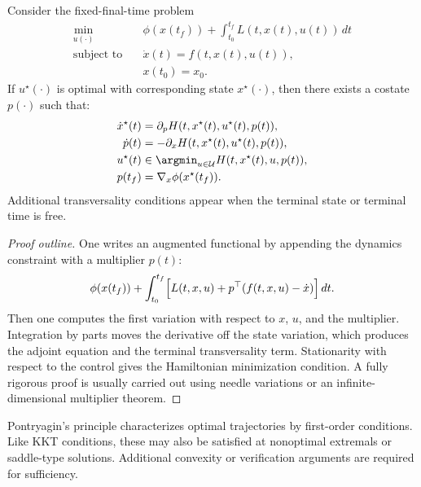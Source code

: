 \begin{theorem}\label{thm:l4-pontryagin-s-minimum-principle}
	Consider the fixed-final-time problem
	\begin{align*}
		\min_{u(\cdot)} \quad & \phi(x(t_f))+\int_{t_0}^{t_f}L(t,x(t),u(t))\,dt \\
		\text{subject to}\quad & \dot x(t)=f(t,x(t),u(t)), \\
		                       & x(t_0)=x_0.
	\end{align*}
	If $u^\star(\cdot)$ is optimal with corresponding state $x^\star(\cdot)$, then there exists a costate $p(\cdot)$ such that:
	\begin{align*}
		\dot x^\star(t) & = \partial_p H(t,x^\star(t),u^\star(t),p(t)), \\
		\dot p(t) & = -\partial_x H(t,x^\star(t),u^\star(t),p(t)), \\
		u^\star(t) & \in \argmin_{u \in \mathcal{U}} H(t,x^\star(t),u,p(t)), \\
		p(t_f) & = \nabla_x \phi(x^\star(t_f)).
	\end{align*}
	Additional transversality conditions appear when the terminal state or terminal time is free.
\end{theorem}
\begin{proof}[Proof outline]
	One writes an augmented functional by appending the dynamics constraint with a multiplier $p(t)$:
	\[
		\phi(x(t_f))+\int_{t_0}^{t_f}\Bigl[L(t,x,u)+p^\top(f(t,x,u)-\dot x)\Bigr]\,dt.
	\]
	Then one computes the first variation with respect to $x$, $u$, and the multiplier. Integration by parts moves the derivative off the state variation, which produces the adjoint equation and the terminal transversality term. Stationarity with respect to the control gives the Hamiltonian minimization condition. A fully rigorous proof is usually carried out using needle variations or an infinite-dimensional multiplier theorem.
\end{proof}

\begin{remark}
	Pontryagin's principle characterizes optimal trajectories by first-order conditions. Like KKT conditions, these may also be satisfied at nonoptimal extremals or saddle-type solutions. Additional convexity or verification arguments are required for sufficiency.
\end{remark}

